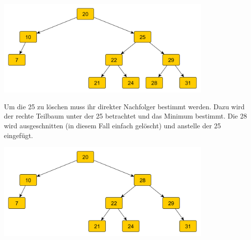 \begin{center}
\includegraphics[width=0.8\textwidth]{512-Baume/2durchgang-27loschen.png}
\end{center}

Um die 25 zu löschen muss ihr direkter Nachfolger bestimmt werden. Dazu wird der rechte Teilbaum unter der 25 betrachtet und das Minimum bestimmt. Die 28 wird ausgeschnitten (in diesem Fall einfach gelöscht) und anstelle der 25 eingefügt.

\begin{center}
\includegraphics[width=0.8\textwidth]{512-Baume/3durchgang-25loschen.png}
\end{center}